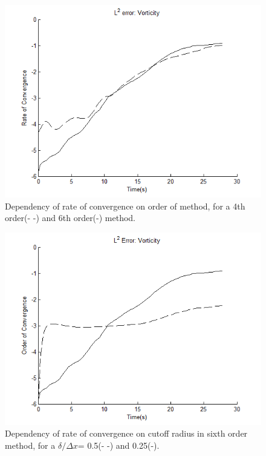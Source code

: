 \documentclass[letterpaper,12pt]{report}
\begin{document}
\begin{figure}
\centering
\includegraphics[width=1\textwidth]{Strain4vs6.PNG}
\caption{\label{fig:Strain4vs6}Dependency of rate of convergence on order of method, for a 4th order(- -) and 6th order(-) method. }
\end{figure}
\begin{figure}
\centering
\includegraphics[width=1\textwidth]{Strain6vs6.PNG}
\caption{\label{fig:Strain6vs6}Dependency of rate of convergence on cutoff radius in sixth order method, for a $\delta/\Delta x$= 0.5(- -) and 0.25(-). }
\end{figure}
%
\end{document}
